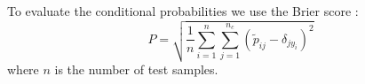 \documentclass{article}
\begin{document}
To evaluate the conditional probabilities we use the Brier score
\citep{Brier1950, Jolliffe_Stephenson2003}:
\begin{equation}
P=\sqrt{\frac{1}{n} \sum_{i=1}^{n} \sum_{j=1}^{n_c} \left ( \tilde p_{ij} - \delta_{jy_i} \right )^2}
\end{equation}
where $n$ is the number of test samples.



\end{document}
